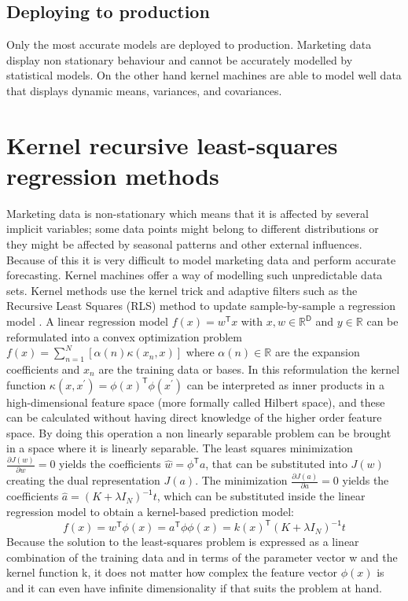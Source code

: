 \subsection{Deploying to production}
Only the most accurate models are deployed to production. Marketing data display non stationary behaviour and cannot be accurately modelled by statistical models. On the other hand kernel machines are able to model well data that displays dynamic means, variances, and covariances.

\newpage
\section{Kernel recursive least-squares regression methods}
Marketing data is non-stationary which means that it is affected by several implicit variables; some data points might belong to different distributions or they might be affected by seasonal patterns and other external influences. Because of this it is very difficult to model marketing data and perform accurate forecasting. Kernel machines offer a way of modelling such unpredictable data sets. Kernel methods use the kernel trick and adaptive filters such as the Recursive Least Squares (RLS) method to update sample-by-sample a regression model \cite{onlineregressionkernels}. A linear regression model \(f(x)=w^\mathsf{T}x \) with \(x, w \in \mathbb{R}^\mathsf{D}\) and \(y \in \mathbb{R} \) can be  reformulated into a convex optimization problem \(f(x)=\sum_{n=1}^{N} [\alpha(n)\kappa(x_n, x)] \) where \(\alpha(n) \in \mathbb{R} \) are the expansion coefficients and \(x_n\) are the training data or bases. In this reformulation the kernel function \(\kappa(x, x^\mathsf{'})=\phi(x)^\mathsf{T}\phi(x^\mathsf{'}) \) can be interpreted as inner products in a high-dimensional feature space (more formally called Hilbert space), and these can be calculated without having direct knowledge of the higher order feature space. By doing this operation a non linearly separable problem can be brought in a space where it is linearly separable. The least squares minimization \(\frac{\partial J(w)}{\partial w}=0\) yields the coefficients \(\hat{w} = \phi^\mathsf{T}a\), that can be substituted into \(J(w)\) creating the dual representation \(J(a)\). The minimization \(\frac{\partial J(a)}{\partial a} = 0\) yields the coefficients \(\hat{a} = (K + \lambda I_N)^\mathsf{-1}t\), which can be substituted inside the linear regression model to obtain a kernel-based prediction model:
\[f(x)=w^\mathsf{T}\phi(x)=a^\mathsf{T}\phi\phi(x) = k(x)^\mathsf{T}(K + \lambda I_N)^\mathsf{-1}t\]
Because the solution to the least-squares problem is expressed as a linear combination of the training data and in terms of the parameter vector w and the kernel function k, it does not matter how complex the feature vector \(\phi(x)\) is and it can even have infinite dimensionality if that suits the problem at hand. \\


